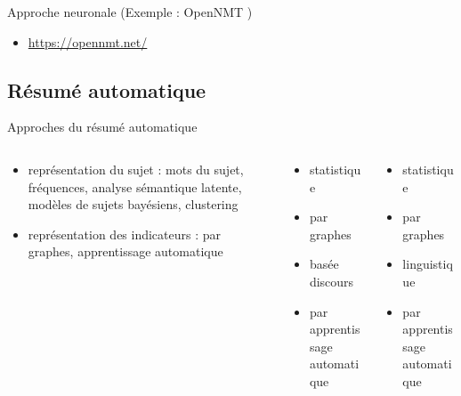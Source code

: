 \documentclass{KodeBook}
\begin{document}
Approche neuronale (Exemple : OpenNMT \cite{17-klein-al})

\begin{itemize}
	\item \url{https://opennmt.net/}
\end{itemize}

\subsection{Résumé automatique}


Approches du résumé automatique

\begin{columns}
	\begin{column}{0.32\textwidth}
		\begin{block}{\scriptsize\bfseries\cite{12-nenkova-mckeown}}
			\begin{itemize}
				\item représentation du sujet 
				:
				mots du sujet,
				fréquences, 
				analyse sémantique latente, 
				modèles de sujets bayésiens,
				clustering
				\item représentation des indicateurs : 
				par graphes, 
				apprentissage automatique
			\end{itemize}
		\end{block}
	\end{column}
	\begin{column}{0.3\textwidth}
		\begin{block}{\scriptsize\bfseries\cite{12-lloret-palomar}}
			\begin{itemize}
				\item statistique 
				\item par graphes
				\item basée discours
				\item par apprentissage automatique
			\end{itemize}
		\end{block}
	\end{column}
	\begin{column}{0.28\textwidth}
		\begin{block}{\scriptsize\bfseries\cite{19-aries-al}}
			\begin{itemize}
				\item statistique 
				\item par graphes
				\item linguistique 
				\item par apprentissage automatique
			\end{itemize}
		\end{block}
	\end{column}
\end{columns}
\end{document}
